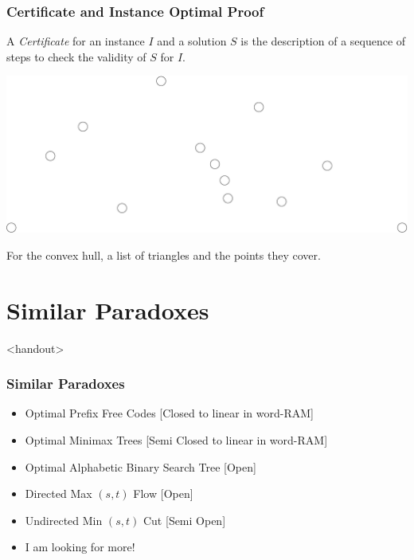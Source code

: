 \documentclass{beamer}
\begin{document}
\begin{frame}
  \frametitle{Certificate and Instance Optimal Proof}
  \begin{definition}[Certificate]
    A \emph{Certificate} for an instance $I$ and a solution $S$ is the
    description of a sequence of steps to \alert{check} the validity
    of $S$ for $I$.
  \end{definition}
  \includegraphics[width=\textwidth]{points}
  \begin{example}
    For the convex hull, a list of triangles and the points they
    cover.
  \end{example}
\end{frame}


\section{Similar Paradoxes}

\begin{frame}<handout>
  \frametitle{Similar Paradoxes}
  \begin{itemize}
  \item Optimal Prefix Free Codes [{Closed to linear in word-RAM}]
  \item Optimal Minimax Trees [{Semi Closed to linear in word-RAM}]
  \item Optimal Alphabetic Binary Search Tree [\alert{Open}]
  \item Directed Max $(s,t)$ Flow [\alert{Open}]
  \item Undirected Min $(s,t)$ Cut [\alert{Semi Open}]
  \item I am looking for more!
  \end{itemize}
\end{frame}

\end{document}
